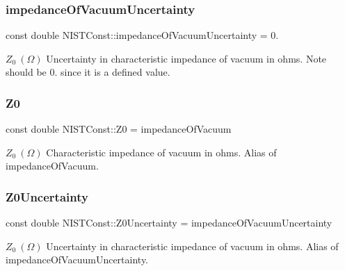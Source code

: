 \subsubsection{\texorpdfstring{impedance\+Of\+Vacuum\+Uncertainty}{impedanceOfVacuumUncertainty}}
{\footnotesize\ttfamily const double N\+I\+S\+T\+Const\+::impedance\+Of\+Vacuum\+Uncertainty = 0.}

$Z_0 \ (\Omega)$ Uncertainty in characteristic impedance of vacuum in ohms. Note should be 0. since it is a defined value. \mbox{\label{group___n_i_s_t_const-_impedance_of_vacuum_ga0de5c47b3a38d72c61aac5574ea154ca}} 
\subsubsection{\texorpdfstring{Z0}{Z0}}
{\footnotesize\ttfamily const double N\+I\+S\+T\+Const\+::\+Z0 = impedance\+Of\+Vacuum}

$Z_0 \ (\Omega)$ Characteristic impedance of vacuum in ohms. Alias of impedance\+Of\+Vacuum. \mbox{\label{group___n_i_s_t_const-_impedance_of_vacuum_gaa511043a811bd20587a1903b52aa6dc7}} 
\subsubsection{\texorpdfstring{Z0\+Uncertainty}{Z0Uncertainty}}
{\footnotesize\ttfamily const double N\+I\+S\+T\+Const\+::\+Z0\+Uncertainty = impedance\+Of\+Vacuum\+Uncertainty}

$Z_0 \ (\Omega)$ Uncertainty in characteristic impedance of vacuum in ohms. Alias of impedance\+Of\+Vacuum\+Uncertainty. 